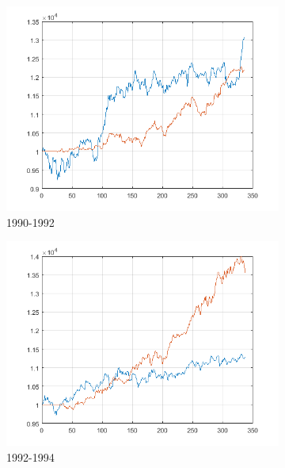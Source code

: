 \documentclass[11pt,a4,twosided,singlespacing,titlepagenumber=on]{scrreprt}
\numberwithin{equation}{chapter} %
\theoremstyle{remark}
\begin{document}
\begin{figure}[H]
    \centering
    \begin{subfigure}[t]{0.32\textwidth}
        \centering
        \includegraphics[width=1\textwidth]{res/backtest_cpx/1}
        \caption{1990-1992}
    \end{subfigure}
    \begin{subfigure}[t]{0.32\textwidth}
        \centering
        \includegraphics[width=1\textwidth]{res/backtest_cpx/2}
        \caption{1992-1994}
    \end{subfigure}
    \begin{subfigure}[t]{0.32\textwidth}
        \centering

\end{subfigure}
\end{figure}
\end{document}

